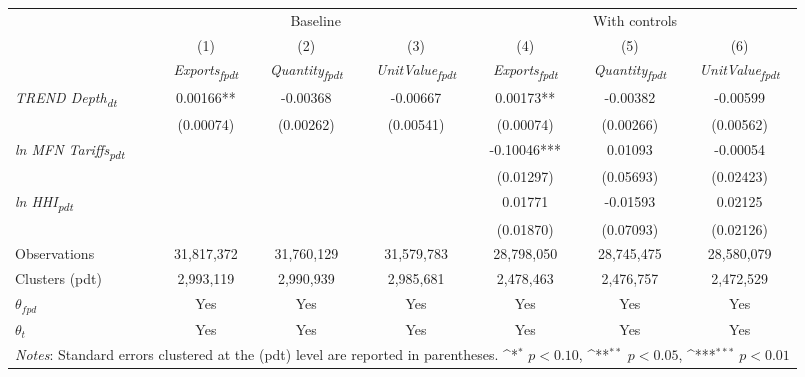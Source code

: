 {
\def\sym#1{\ifmmode^{#1}\else\(^{#1}\)\fi}
\begin{tabular}{l*{6}{c}}
\toprule
                &\multicolumn{3}{c}{Baseline}                            &\multicolumn{3}{c}{With controls}                       \\\cmidrule(lr){2-4}\cmidrule(lr){5-7}
                &\multicolumn{1}{c}{(1)}&\multicolumn{1}{c}{(2)}&\multicolumn{1}{c}{(3)}&\multicolumn{1}{c}{(4)}&\multicolumn{1}{c}{(5)}&\multicolumn{1}{c}{(6)}\\
                &\multicolumn{1}{c}{\textit{Exports\textsubscript{fpdt}}}&\multicolumn{1}{c}{\textit{Quantity\textsubscript{fpdt}}}&\multicolumn{1}{c}{\textit{UnitValue\textsubscript{fpdt}}}&\multicolumn{1}{c}{\textit{Exports\textsubscript{fpdt}}}&\multicolumn{1}{c}{\textit{Quantity\textsubscript{fpdt}}}&\multicolumn{1}{c}{\textit{UnitValue\textsubscript{fpdt}}}\\
\midrule
\textit{TREND Depth\textsubscript{dt}} & 0.00166** & -0.00368 & -0.00667 & 0.00173** & -0.00382 & -0.00599\\
 & (0.00074) & (0.00262) & (0.00541) & (0.00074) & (0.00266) & (0.00562)\\
\addlinespace
\textit{ln MFN Tariffs\textsubscript{pdt}} &  &  &  & -0.10046*** & 0.01093 & -0.00054\\
 &  &  &  & (0.01297) & (0.05693) & (0.02423)\\
\addlinespace
\textit{ln HHI\textsubscript{pdt}} &  &  &  & 0.01771 & -0.01593 & 0.02125\\
 &  &  &  & (0.01870) & (0.07093) & (0.02126)\\
\addlinespace
\midrule
\midrule
Observations & 31,817,372 & 31,760,129 & 31,579,783 & 28,798,050 & 28,745,475 & 28,580,079\\
Clusters (pdt) & 2,993,119 & 2,990,939 & 2,985,681 & 2,478,463 & 2,476,757 & 2,472,529\\
$\theta_{fpd}$ & Yes & Yes & Yes & Yes & Yes & Yes\\
$\theta_t$ & Yes & Yes & Yes & Yes & Yes & Yes\\
\bottomrule
\multicolumn{7}{l}{\footnotesize \textit{Notes}: Standard errors clustered at the (pdt) level are reported in parentheses. \sym{*} \(p<0.10\), \sym{**} \(p<0.05\), \sym{***} \(p<0.01\)}\\
\end{tabular}
}
